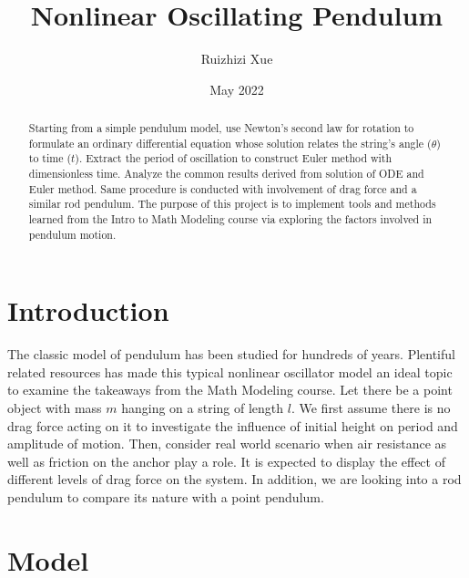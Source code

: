 \documentclass{article}
\title{Nonlinear Oscillating Pendulum}
\author{Ruizhizi Xue}
\date{May 2022}
\begin{document}
\maketitle

\begin{abstract}
    Starting from a simple pendulum model, use Newton’s second law for rotation to formulate an ordinary differential equation whose solution relates the string’s angle ($\theta$) to time ($t$). Extract the period of oscillation to construct Euler method with dimensionless time. Analyze the common results derived from solution of ODE and Euler method. Same procedure is conducted with involvement of drag force and a similar rod pendulum. The purpose of this project is to implement tools and methods learned from the Intro to Math Modeling course via exploring the factors involved in pendulum motion.
\end{abstract}

\tableofcontents


\section{Introduction}
\quad The classic model of pendulum has been studied for hundreds of years. Plentiful related resources has made this typical nonlinear oscillator model an ideal topic to examine the takeaways from the Math Modeling course. Let there be a point object with mass $m$ hanging on a string of length $l$. We first assume there is no drag force acting on it to investigate the influence of initial height on period and amplitude of motion. Then, consider real world scenario when air resistance as well as friction on the anchor play a role. It is expected to display the effect of different levels of drag force on the system. In addition, we are looking into a rod pendulum to compare its nature with a point pendulum.


\section{Model}
\end{document}
